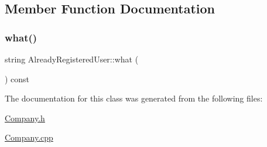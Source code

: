 \subsection{Member Function Documentation}
\mbox{\label{class_already_registered_user_ae9f46091d164347cc12e45591d86d5a5}} 
\subsubsection{\texorpdfstring{what()}{what()}}
{\footnotesize\ttfamily string Already\+Registered\+User\+::what (\begin{DoxyParamCaption}{ }\end{DoxyParamCaption}) const}



The documentation for this class was generated from the following files\+:\begin{DoxyCompactItemize}
\item 
\mbox{\hyperlink{_company_8h}{Company.\+h}}\item 
\mbox{\hyperlink{_company_8cpp}{Company.\+cpp}}\end{DoxyCompactItemize}
